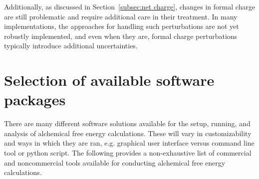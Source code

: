 \documentclass[9pt,bestpractices]{livecoms}
\begin{document}
Additionally, as discussed in Section~\ref{subsec:net charge}, changes in formal charge are still problematic and require additional care in their treatment. In many implementations, the approaches for handling such perturbations are not yet robustly implemented, and even when they are, formal charge perturbations typically introduce additional uncertainties.

\section{Selection of available software packages}

\label{sec:software}
There are many different software solutions available for the setup, running, and analysis of alchemical free energy calculations. These will vary in customizability and ways in which they are ran, e.g. graphical user interface versus command line tool or python script. The following provides a non-exhaustive list of commercial and noncommercial tools available for conducting alchemical free energy calculations. 
\end{document}
